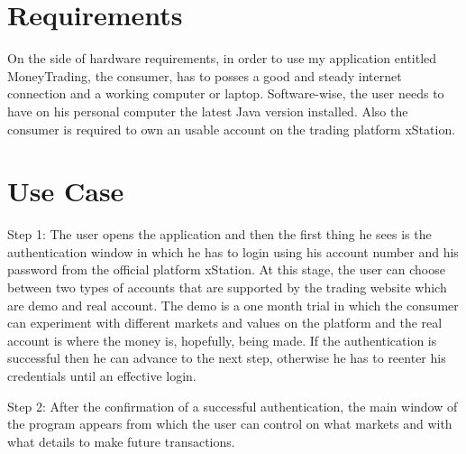 \documentclass[12pt,a4paper]{report}
\begin{document}
\section{Requirements}
On the side of hardware requirements, in order to use my application entitled MoneyTrading, the consumer, has to posses a good and steady internet connection and a working computer or laptop. Software-wise, the user needs to have on his personal computer the latest Java version installed. Also the consumer is required to own an usable account on the trading platform xStation.

\section{Use Case}
Step 1: The user opens the application and then the first thing he sees is the authentication window in which he has to login using his account number and his password from the official platform xStation. At this stage, the user can choose between two types of accounts that are supported by the trading website which are demo and real account. The demo is a one month trial in which the consumer can experiment with different markets and values on the platform and the real account is where the money is, hopefully, being made. If the authentication is successful then he can advance to the next step, otherwise he has to reenter his credentials until an effective login.

Step 2:
After the confirmation of a successful authentication, the main window of the program appears from which the user can control on what markets and with what details to make future transactions.
\end{document}
